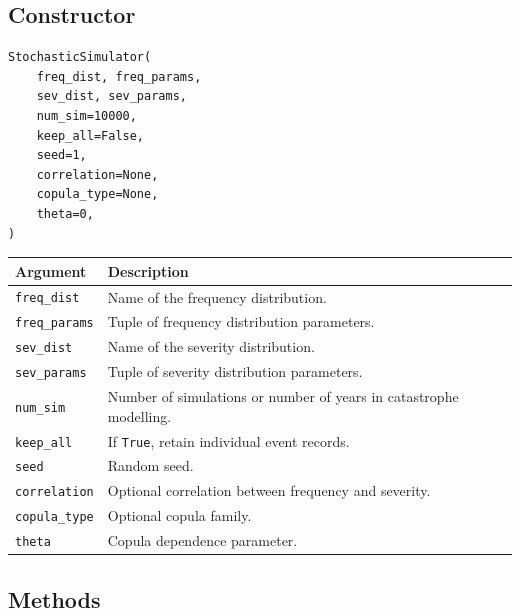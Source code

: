 \subsection*{Constructor}

\begin{lstlisting}[style=pythonstyle]
StochasticSimulator(
    freq_dist, freq_params,
    sev_dist, sev_params,
    num_sim=10000,
    keep_all=False,
    seed=1,
    correlation=None,
    copula_type=None,
    theta=0,
)
\end{lstlisting}

\begin{longtable}{p{}p{}}
\toprule
\textbf{Argument} & \textbf{Description} \\
\midrule
\endhead
\texttt{freq\_dist}    & Name of the frequency distribution. \\
\texttt{freq\_params}  & Tuple of frequency distribution parameters. \\
\texttt{sev\_dist}     & Name of the severity distribution. \\
\texttt{sev\_params}   & Tuple of severity distribution parameters. \\
\texttt{num\_sim}      & Number of simulations or number of years in catastrophe modelling. \\
\texttt{keep\_all}     & If \texttt{True}, retain individual event records. \\
\texttt{seed}          & Random seed. \\
\texttt{correlation}   & Optional correlation between frequency and severity. \\
\texttt{copula\_type}  & Optional copula family. \\
\texttt{theta}         & Copula dependence parameter. \\
\bottomrule
\end{longtable}

\subsection*{Methods}

